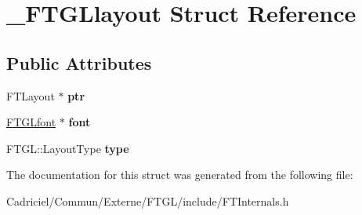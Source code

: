 \hypertarget{struct___f_t_g_llayout}{}\section{\+\_\+\+F\+T\+G\+Llayout Struct Reference}
\label{struct___f_t_g_llayout}
\subsection*{Public Attributes}
\begin{DoxyCompactItemize}
\item 
F\+T\+Layout $\ast$ {\bfseries ptr}\hypertarget{struct___f_t_g_llayout_aa005e0b4dbed84077bc849aee6cc072a}{}\label{struct___f_t_g_llayout_aa005e0b4dbed84077bc849aee6cc072a}

\item 
\hyperlink{struct___f_t_g_lfont}{F\+T\+G\+Lfont} $\ast$ {\bfseries font}\hypertarget{struct___f_t_g_llayout_a85b58d0b7343ae0b396417b3cf74ce06}{}\label{struct___f_t_g_llayout_a85b58d0b7343ae0b396417b3cf74ce06}

\item 
F\+T\+G\+L\+::\+Layout\+Type {\bfseries type}\hypertarget{struct___f_t_g_llayout_ace10a672a5f6d779ede1c6dfba6096f2}{}\label{struct___f_t_g_llayout_ace10a672a5f6d779ede1c6dfba6096f2}

\end{DoxyCompactItemize}


The documentation for this struct was generated from the following file\+:\begin{DoxyCompactItemize}
\item 
Cadriciel/\+Commun/\+Externe/\+F\+T\+G\+L/include/F\+T\+Internals.\+h\end{DoxyCompactItemize}
